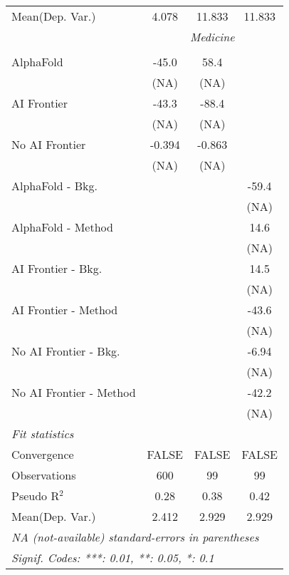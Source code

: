 \begin{tabular}{lccc}
Mean(Dep. Var.) & 4.078 & 11.833 & 11.833 \\
 & \multicolumn{3}{c}{\textit{Medicine}} \\ \\
   AlphaFold               & -45.0  & 58.4   &   \\   
                           & (NA)   & (NA)   &   \\   
   AI Frontier             & -43.3  & -88.4  &   \\   
                           & (NA)   & (NA)   &   \\   
   No AI Frontier          & -0.394 & -0.863 &   \\   
                           & (NA)   & (NA)   &   \\   
   AlphaFold - Bkg.        &        &        & -59.4\\   
                           &        &        & (NA)\\   
   AlphaFold - Method      &        &        & 14.6\\   
                           &        &        & (NA)\\   
   AI Frontier - Bkg.      &        &        & 14.5\\   
                           &        &        & (NA)\\   
   AI Frontier - Method    &        &        & -43.6\\   
                           &        &        & (NA)\\   
   No AI Frontier - Bkg.   &        &        & -6.94\\   
                           &        &        & (NA)\\   
   No AI Frontier - Method &        &        & -42.2\\   
                           &        &        & (NA)\\   
   \midrule
   \emph{Fit statistics}\\
   Convergence             &FALSE   & FALSE  & FALSE\\  
   Observations            & 600    & 99     & 99\\  
   Pseudo R$^2$            & 0.28   & 0.38   & 0.42\\  
Mean(Dep. Var.) & 2.412 & 2.929 & 2.929 \\
   \midrule \midrule
   \multicolumn{4}{l}{\emph{NA (not-available) standard-errors in parentheses}}\\
   \multicolumn{4}{l}{\emph{Signif. Codes: ***: 0.01, **: 0.05, *: 0.1}}\\
\end{tabular}
\par\endgroup
